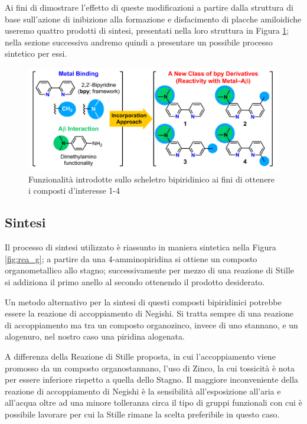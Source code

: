 \documentclass[a4paper, 12pt]{article}
\begin{document}
Ai fini di dimostrare l'effetto di queste modificazioni a partire dalla struttura di base sull'azione di inibizione alla formazione e disfacimento di placche amiloidiche useremo quattro prodotti di sintesi, presentati nella loro struttura in Figura \ref{fig:bpy_mod}; nella sezione successiva andremo quindi a presentare un possibile processo sintetico per essi.

\begin{figure}[H]
	\centering
	\includegraphics[width=\linewidth]{immagini/bpy_mod.png}
	\caption{Funzionalità introdotte sullo scheletro bipiridinico ai fini di ottenere i composti d'interesse 1-4}
	\label{fig:bpy_mod}
\end{figure}

\subsection{Sintesi}
\label{sec:bpy_stille}
Il processo di sintesi utilizzato è riassunto in maniera sintetica nella Figura \ref{fig:rea_g}; a partire da una 4-amminopiridina si ottiene un composto organometallico allo stagno; successivamente per mezzo di una reazione di Stille si addiziona il primo anello al secondo ottenendo il prodotto desiderato.

Un metodo alternativo per la sintesi di questi composti bipiridinici potrebbe essere la reazione di accoppiamento di Negishi. Si tratta sempre di una reazione di accoppiamento ma tra un composto organozinco, invece di uno stannano, e un alogenuro, nel nostro caso una piridina alogenata. \autocite{clayden_organic_2012}

A differenza della Reazione di Stille proposta, in cui l'accoppiamento viene promosso da un composto organostannano, l'uso di Zinco, la cui tossicità è nota per essere inferiore rispetto a quella dello Stagno. Il maggiore inconveniente della reazione di accoppiamento di Negishi è la sensibilità all'esposizione all'aria e all'acqua oltre ad una minore tolleranza circa il tipo di gruppi funzionali con cui è possibile lavorare per cui la Stille rimane la scelta preferibile in questo caso. \autocite{nicolaou_palladium-catalyzed_2005}
\end{document}

